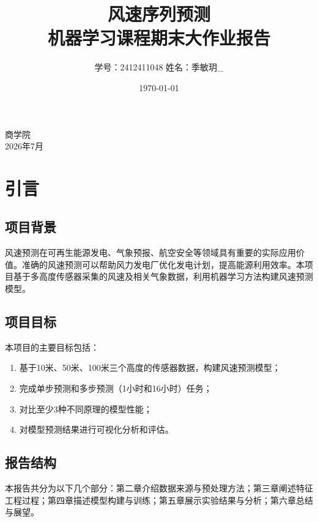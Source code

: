 \documentclass[12pt,a4paper]{article}
\title{\textbf{风速序列预测}\\ \large{机器学习课程期末大作业报告}}
\author{学号：2412411048 \quad 姓名：季敏玥_}
\date{\today}
\begin{document}
\maketitle
\begin{center}
    \vspace{2cm}
    \large{商学院}\\ 
    \large{2026年7月}
\end{center}

\newpage

\tableofcontents
\newpage

\section{引言}

\subsection{项目背景}
风速预测在可再生能源发电、气象预报、航空安全等领域具有重要的实际应用价值。准确的风速预测可以帮助风力发电厂优化发电计划，提高能源利用效率。本项目基于多高度传感器采集的风速及相关气象数据，利用机器学习方法构建风速预测模型。

\subsection{项目目标}
本项目的主要目标包括：
\begin{enumerate}
    \item 基于10米、50米、100米三个高度的传感器数据，构建风速预测模型；
    \item 完成单步预测和多步预测（1小时和16小时）任务；
    \item 对比至少3种不同原理的模型性能；
    \item 对模型预测结果进行可视化分析和评估。
\end{enumerate}

\subsection{报告结构}
本报告共分为以下几个部分：第二章介绍数据来源与预处理方法；第三章阐述特征工程过程；第四章描述模型构建与训练；第五章展示实验结果与分析；第六章总结与展望。

\newpage

\end{document}
